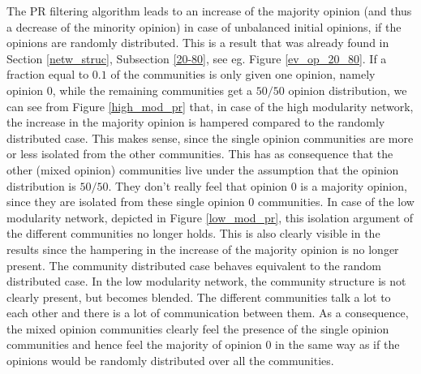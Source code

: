 \documentclass[11 pt , letterpaper , twoside , openright]{book}
\begin{document}
The PR filtering algorithm leads to an increase of the majority opinion (and thus a decrease of the minority opinion) in case of unbalanced initial opinions, if the opinions are randomly distributed. This is a result that was already found in Section \ref{netw_struc}, Subsection \ref{20-80}, see eg. Figure \ref{ev_op_20_80}. If a fraction equal to $0.1$ of the communities is only given one opinion, namely opinion 0, while the remaining communities get a $50/50$ opinion distribution, we can see from Figure \ref{high_mod_pr} that, in case of the high modularity network, the increase in the majority opinion is hampered compared to the randomly distributed case. This makes sense, since the single opinion communities are more or less isolated from the other communities. This has as consequence that the other (mixed opinion) communities live under the assumption that the opinion distribution is $50/50$. They don't really feel that opinion 0 is a majority opinion, since they are isolated from these single opinion 0 communities. In case of the low modularity network, depicted in Figure \ref{low_mod_pr}, this isolation argument of the different communities no longer holds. This is also clearly visible in the results since the hampering in the increase of the majority opinion is no longer present. The community distributed case behaves equivalent to the random distributed case. In the low modularity network, the community structure is not clearly present, but becomes blended. The different communities talk a lot to each other and there is a lot of communication between them. As a consequence, the mixed opinion communities clearly feel the presence of the single opinion communities and hence feel the majority of opinion 0 in the same way as if the opinions would be randomly distributed over all the communities. 
\end{document}
